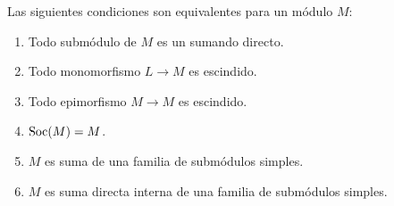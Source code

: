 \begin{teo}
  Las siguientes condiciones son equivalentes para un módulo \(M\):
  \begin{enumerate}
    \item Todo submódulo de \(M\) es un sumando directo.
    \item Todo monomorfismo \(L\longrightarrow M\) es escindido.
    \item Todo epimorfismo \(M\longrightarrow M \) es escindido.
    \item \(\operatorname{Soc}(M)=M\).
    \item \(M\) es suma de una familia de submódulos simples.
    \item \(M\) es suma directa interna de una familia de submódulos simples.
  \end{enumerate}
\end{teo}


